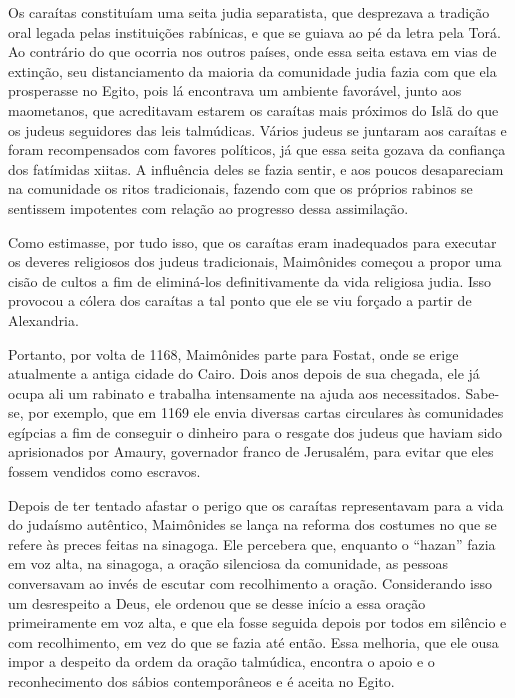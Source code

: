 Os caraítas constituíam uma seita judia separatista, que desprezava a
tradição oral legada pelas instituições rabínicas, e que se guiava ao pé
da letra pela Torá. Ao contrário do que ocorria nos outros
países, onde essa seita estava em vias de extinção, seu distanciamento
da maioria da comunidade judia fazia com que ela prosperasse no Egito, 
pois lá encontrava um ambiente
favorável, junto aos maometanos, que acreditavam estarem os caraítas
mais próximos do Islã do que os judeus seguidores das leis talmúdicas.
Vários judeus se juntaram aos caraítas e foram recompensados com favores
políticos, já que essa seita gozava da confiança dos fatímidas xiitas. A
influência deles se fazia sentir, e aos poucos desapareciam na
comunidade os ritos tradicionais, fazendo com que os próprios rabinos
se sentissem impotentes com relação ao progresso dessa assimilação.

Como estimasse, por tudo isso, que os caraítas eram inadequados para
executar os deveres religiosos dos judeus tradicionais, Maimônides
começou a propor uma cisão de cultos a fim de eliminá-los
definitivamente da vida religiosa judia. Isso provocou a cólera dos
caraítas a tal ponto que ele se viu forçado a partir de Alexandria.

Portanto, por volta de 1168, Maimônides parte para Fostat, onde se erige
atualmente a antiga cidade do Cairo. Dois anos depois de sua chegada,
ele já ocupa ali um rabinato e trabalha intensamente na ajuda aos
necessitados. Sabe-se, por exemplo, que em 1169 ele envia diversas
cartas circulares às comunidades egípcias a fim de conseguir o dinheiro
para o resgate dos judeus que haviam sido aprisionados por Amaury,
governador franco de Jerusalém, para evitar que eles fossem vendidos
como escravos.

Depois de ter tentado afastar o perigo que os caraítas representavam
para a vida do judaísmo autêntico, Maimônides se lança na reforma dos
costumes no que se refere às preces feitas na sinagoga. Ele percebera
que, enquanto o ``hazan'' fazia em voz alta, na sinagoga, a oração
silenciosa da comunidade, as pessoas conversavam ao invés de escutar com
recolhimento a oração. Considerando isso um desrespeito a Deus, ele
ordenou que se desse início a essa oração primeiramente em voz alta, e
que ela fosse seguida depois por todos em silêncio e com recolhimento,
em vez do que se fazia até então. Essa melhoria, que ele ousa impor a
despeito da ordem da oração talmúdica, encontra o apoio e o
reconhecimento dos sábios contemporâneos e é aceita no Egito.

